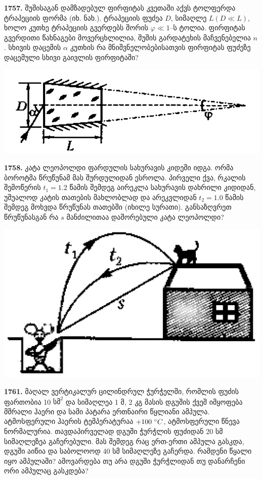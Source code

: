 \documentclass[12pt,a4paper,]{report}
\begin{document}
\textbf{1757.} შუშისაგან დამზადებულ ფირფიტას კვეთაში აქვს ტოლფერდა ტრაპეციის ფორმა (იხ. ნახ.). ტრაპეციის ფუძეა $D$, სიმაღლე $L (D\ll L)$, ხოლო კუთხე ტრაპეციის გვერდებს შორის $\varphi \ll 1$–ს ტოლია. ფირფიტას გვერდითი წახნაგები მოვერცხლილია, შუშის გარდატეხის მაჩვენებელია $n$. სხივის დაცემის $\alpha$ კუთხის რა მნიშვნელობებისათვის ფირფიტას ფუძეზე დაცემული სხივი გაივლის ფირფიტაში?
	\begin{center}
		\includegraphics[scale=0.4]{images/F1757.png}
	\end{center}

\textbf{1758.} კატა ლეოპოლდი ფარდულის სახურავის კიდეში იდგა. ორმა ბოროტმა წრუწუნამ მას შურდულიდან ესროლა. პირველი ქვა, რკალის შემოწერის $t_1 = 1.2$ წამის შემდეგ აირეკლა სახურავის დახრილი კიდიდან, უშუალოდ კატის თათების მახლობლად და არეკვლიდან $t_2 = 1.0$ წამის შემდეგ მოხვდა წრუწუნას თათებში (იხილე სურათი). განსაზღვრეთ წრუწუნასგან რა $s$ მანძილითაა დაშორებული კატა ლეოპოლდი?                     
	\begin{center}
		\includegraphics[scale=0.2]{images/1758.png}
	\end{center}

\textbf{1761.} მაღალ ვერტიკალურ ცილინდრულ ჭურჭელში, რომლის ფუძის ფართობია 10 $\text{სმ}^2$ და სიმაღლეა 1 მ, 2 კგ მასის დგუშის ქვეშ იმყოფება მშრალი ჰაერი და სამი პატარა ერთნაირი წყლიანი ამპულა. ატმოსფერული ჰაერის ტემპერატურაა $+100\ \degree C$, ატმოსფერული წნევა ნორმალურია. თავდაპირველად დგუში ჭურჭლის ფუძიდან 20 სმ სიმაღლეზეა გაჩერებული. მას შემდეგ რაც ერთ-ერთი ამპულა გასკდა, დგუში აიწია და საბოლოოდ 40 სმ სიმაღლეზე გაჩერდა. რამდენი წყალი იყო ამპულაში? ამოვარდება თუ არა დგუში ჭურჭლიდან თუ დანარჩენი ორი ამპულაც გასკდება?
\end{document}
